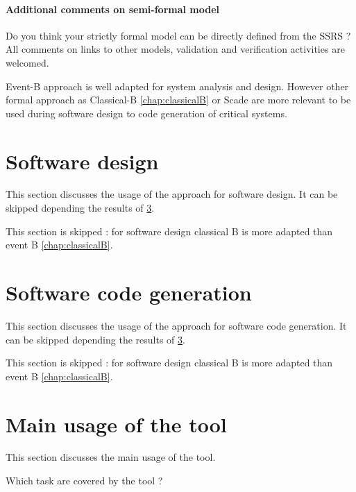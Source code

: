 \paragraph{Additional comments on semi-formal  model} Do you think your strictly formal  model can be directly defined from the SSRS ?
All comments on links to  other models, validation and verification activities are welcomed.


\begin{author_comment}
Event-B  approach is well adapted for system analysis and design. However other formal approach as Classical-B \ref{chap:classicalB} or Scade are more relevant to be used during software design to code generation of critical systems.
\end{author_comment}


\section{Software design}
This section discusses the usage of the approach for software design.
It can be skipped depending the results of \ref{main_usage}.


\begin{author_comment}
This section is skipped :  for software design classical B is more adapted than event B \ref{chap:classicalB}.
\end{author_comment}



\section{Software code generation}
This section discusses the usage of the approach for software code generation.
It can be skipped depending the results of \ref{main_usage}.


\begin{author_comment}
This section is skipped :  for software design classical B is more adapted than event B \ref{chap:classicalB}.
\end{author_comment}




\section{Main usage of the tool}
\label{main_usage}

This section discusses the main usage of the tool.

Which task are covered by the tool ?


